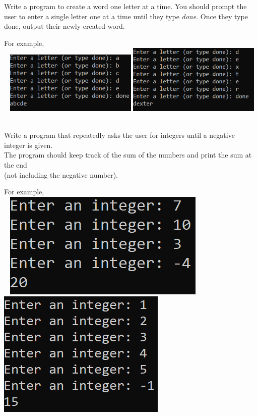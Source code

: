 


	\item   
		Write a program to create a word one letter at a time.  You should prompt the user to enter 
		a single letter one at a time until they type \textit{done}.  Once they type done, output 
		their newly created word.
		
		For example, \\ \ \hfill
		\includegraphics[width = 2.5in]{./imgs/lettersAbcde.PNG} \hfill  
		\includegraphics[width = 2.5in]{./imgs/lettersDexter.PNG} \hfill \


	\item  
		Write a program that repeatedly asks the user for integers until a negative integer is 
		given. \\ The program should keep track of the sum of the numbers and print the sum at the 
		end \\(not including the negative number).

		For example, \\ \ \hfill
		\includegraphics[width = 2.in]{./imgs/AddCalc2.PNG} \hfill  
		\includegraphics[width = 2.in]{./imgs/AddCalc1.PNG} \hfill \


